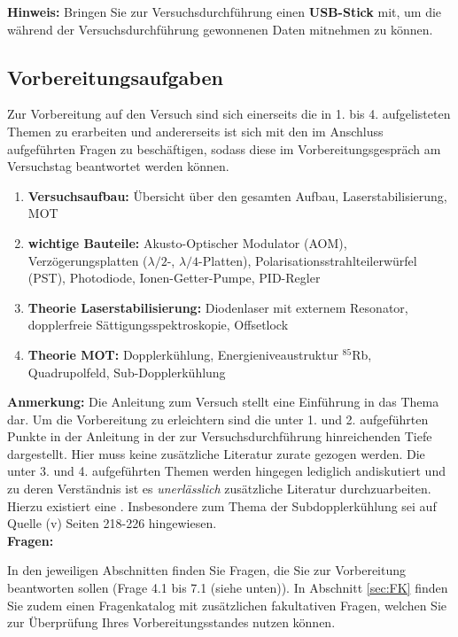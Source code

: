 \documentclass[
class=book,
accentcolor=1b,
custommargins=geometry,
fontsize=11pt,
thesis={type=Versuchsanleitung},
ruledheaders=all,
headline=false,
instbox=false,
marginpar=false,
title=small,
ignore-missing-data=true,
twoside=false,
logofile=apqdesign/tuda_logo.pdf,
pdfa=false %
]{apqpub}
\begin{document}
\textbf{Hinweis:} Bringen Sie zur Versuchsdurchführung einen  \textbf{USB-Stick} mit, um die während der Versuchsdurchführung gewonnenen Daten mitnehmen zu können.

\subsection{Vorbereitungsaufgaben}

Zur Vorbereitung auf den Versuch sind sich einerseits die in 1. bis 4. aufgelisteten Themen zu erarbeiten und andererseits ist sich mit den im Anschluss aufgeführten Fragen zu beschäftigen, sodass diese im Vorbereitungsgespräch am Versuchstag beantwortet werden können. 

\begin{enumerate}
	\item \textbf{Versuchsaufbau:} Übersicht über den gesamten Aufbau, Laserstabilisierung, MOT
	
	\item \textbf{wichtige Bauteile:} Akusto-Optischer Modulator (AOM), Verzögerungsplatten ($\lambda/2$-, $\lambda/4$-Platten), Polarisationsstrahlteilerwürfel (PST), Photodiode, Ionen-Getter-Pumpe, PID-Regler
	
	\item \textbf{Theorie Laserstabilisierung:} Diodenlaser mit externem Resonator, dopplerfreie Sättigungsspektroskopie, Offsetlock
	
	\item \textbf{Theorie MOT:} Dopplerkühlung, Energieniveaustruktur $^{85}$Rb, Quadrupolfeld, Sub-Dopplerkühlung   
\end{enumerate}

\textbf{Anmerkung:} Die Anleitung zum Versuch stellt eine Einführung in das Thema dar. Um die Vorbereitung zu erleichtern sind die unter 1. und 2. aufgeführten Punkte in der Anleitung in der zur Versuchsdurchführung hinreichenden Tiefe dargestellt. Hier muss keine zusätzliche Literatur zurate gezogen werden. Die unter 3. und 4. aufgeführten Themen werden hingegen lediglich andiskutiert und zu deren Verständnis ist es \textit{unerlässlich} zusätzliche Literatur durchzuarbeiten. Hierzu existiert eine . Insbesondere zum Thema der Subdopplerkühlung sei auf Quelle (v) Seiten 218-226 hingewiesen.\\

\textbf{Fragen:}  

In den jeweiligen Abschnitten finden Sie Fragen, die Sie zur Vorbereitung beantworten sollen (Frage 4.1 bis 7.1 (siehe unten)). In Abschnitt \ref{sec:FK} finden Sie zudem einen Fragenkatalog mit zusätzlichen fakultativen Fragen, welchen Sie zur Überprüfung Ihres Vorbereitungsstandes nutzen können.
\end{document}
